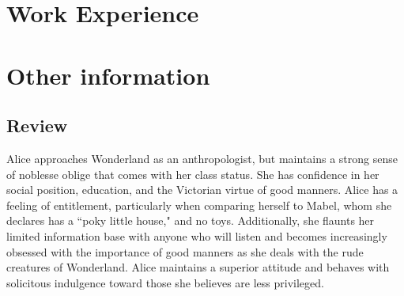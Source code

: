 \documentclass[a4paper]{twentysecondcv} %
\begin{document}

\newpage %

\makeprofile %

\section{Work Experience}

\begin{twenty} %
\end{twenty}


\section{Other information}

\subsection{Review}

Alice approaches Wonderland as an anthropologist, but maintains a
strong sense of noblesse oblige that comes with her class status. She
has confidence in her social position, education, and the Victorian
virtue of good manners. Alice has a feeling of entitlement,
particularly when comparing herself to Mabel, whom she declares has a
``poky little house," and no toys. Additionally, she flaunts her
limited information base with anyone who will listen and becomes
increasingly obsessed with the importance of good manners as she deals
with the rude creatures of Wonderland. Alice maintains a superior
attitude and behaves with solicitous indulgence toward those she
believes are less privileged.
\end{document}
